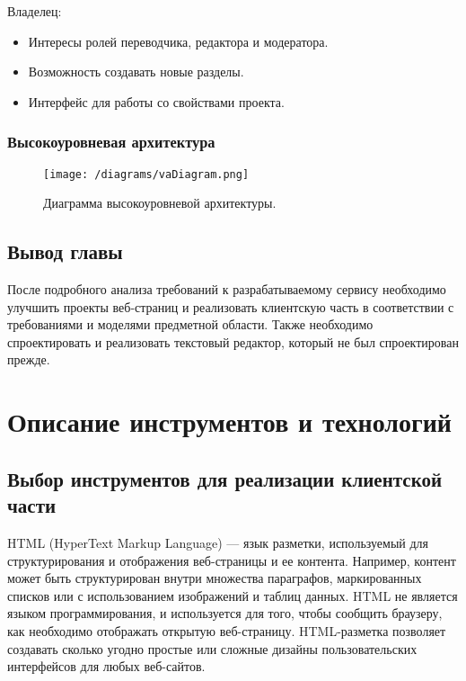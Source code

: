\documentclass[a4paper,12pt]{article}
\begin{document}
Владелец:
\begin{itemize}
\item Интересы ролей переводчика, редактора и модератора.
\item Возможность создавать новые разделы.
\item Интерфейс для работы со свойствами проекта.
\end{itemize}

\subsubsection{Высокоуровневая архитектура}

\begin{figure}[H]
\centering
\texttt{[image: /diagrams/vaDiagram.png]}
\caption{Диаграмма высокоуровневой архитектуры.}
\label{fig:diagramarchitecture}
\end{figure}




\subsection{Вывод главы}
После подробного анализа требований к разрабатываемому сервису необходимо улучшить проекты веб-страниц и реализовать клиентскую часть в соответствии с требованиями и моделями предметной области. Также необходимо спроектировать и реализовать текстовый редактор, который не был спроектирован прежде.






\newpage
\section{Описание инструментов и технологий}
\subsection{Выбор инструментов для реализации клиентской части}
HTML (HyperText Markup Language) — язык разметки, используемый для структурирования и отображения веб-страницы и ее контента. Например, контент может быть структурирован внутри множества параграфов, маркированных списков или с использованием изображений и таблиц данных. HTML не является языком программирования, и используется для того, чтобы сообщить браузеру, как необходимо отображать открытую веб-страницу. HTML-разметка позволяет создавать сколько угодно простые или сложные дизайны пользовательских интерфейсов для любых веб-сайтов. \cite{website:html}\\
\end{document}
